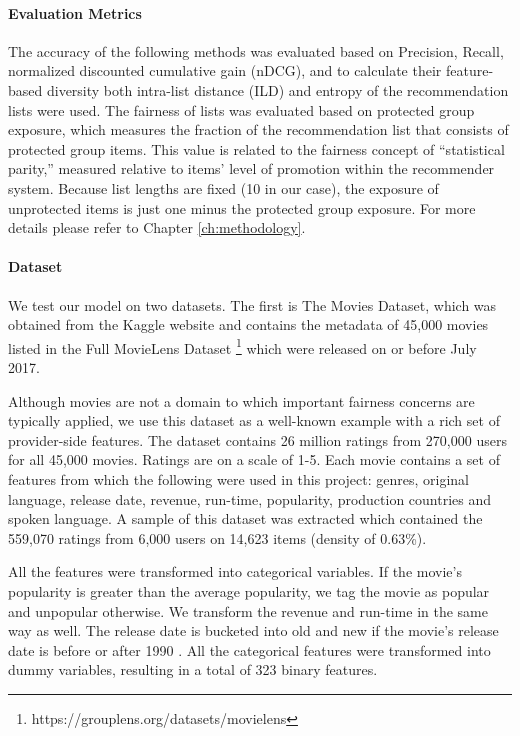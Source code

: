 \noindent\paragraph{\textbf{Evaluation Metrics}}
\newline
\indent The accuracy of the following methods was evaluated based on Precision, Recall, normalized discounted cumulative gain (nDCG), and to calculate their feature-based diversity both intra-list distance (ILD) and entropy of the recommendation lists were used. The fairness of lists was evaluated based on protected group exposure, which measures the fraction of the recommendation list that consists of protected group items. This value is related to the fairness concept of ``statistical parity,'' measured relative to items' level of promotion within the recommender system. Because list lengths are fixed (10 in our case), the exposure of unprotected items is just one minus the protected group exposure. For more details please refer to Chapter \ref{ch:methodology}.

\noindent\paragraph{\textbf{Dataset}}
\newline
\indent We test our model on two datasets. The first is The Movies Dataset, which was obtained from the Kaggle website and contains the metadata of 45,000 movies listed in the Full MovieLens Dataset \footnote{https://grouplens.org/datasets/movielens} which were released on or before July 2017.

Although movies are not a domain to which important fairness concerns are typically applied, we use this dataset as a well-known example with a rich set of provider-side features. The dataset contains 26 million ratings from 270,000 users for all 45,000 movies. Ratings are on a scale of 1-5. Each movie contains a set of features from which the following were used in this project: genres, original language, release date, revenue, run-time, popularity, production countries and spoken language. A sample of this dataset was extracted which contained the 559,070 ratings from 6,000 users on 14,623 items (density of 0.63\%).

All the features were transformed into categorical variables. If the movie's popularity is greater than the average popularity, we tag the movie as popular and unpopular otherwise. We transform the revenue and run-time in the same way as well. The release date is bucketed into old and new if the movie's release date is before or after 1990 \cite{kamishima2016model}. All the categorical features were transformed into dummy variables, resulting in a total of 323 binary features.

